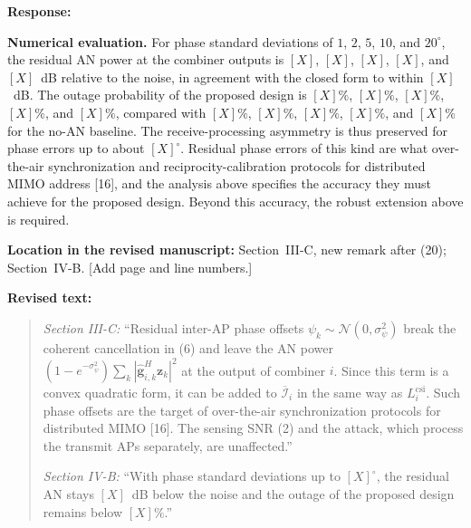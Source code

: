 \documentclass[a4paper,12pt]{article}
\newenvironment{response}{\par\textbf{Response:}\par}{\par}
\newcommand{\revisionlocation}[1]{\par\textbf{Location in the revised manuscript:} #1\par}
\newenvironment{revisedtext}{%
  \par\textbf{Revised text:}\begin{quote}\color{red}
}{\end{quote}}
\begin{document}
\begin{response}
\textbf{Numerical evaluation.} For phase standard deviations of $1$, $2$,
$5$, $10$, and $20^\circ$, the residual AN power at the combiner outputs is
$[X]$, $[X]$, $[X]$, $[X]$, and $[X]$~dB relative to the noise, in agreement
with the closed form to within $[X]$~dB. The outage probability of the
proposed design is $[X]\%$, $[X]\%$, $[X]\%$, $[X]\%$, and $[X]\%$, compared
with $[X]\%$, $[X]\%$, $[X]\%$, $[X]\%$, and $[X]\%$ for the no-AN baseline.
The receive-processing asymmetry is thus preserved for phase errors up to
about $[X]^\circ$. Residual phase errors of this kind are what over-the-air
synchronization and reciprocity-calibration protocols for distributed MIMO
address [16], and the analysis above specifies the accuracy they must
achieve for the proposed design. Beyond this accuracy, the robust extension
above is required.
\end{response}
\revisionlocation{Section~III-C, new remark after (20); Section~IV-B. [Add
page and line numbers.]}
\begin{revisedtext}
\textit{Section III-C:} ``Residual inter-AP phase offsets
$\psi_k\sim\mathcal{N}(0,\sigma_\psi^2)$ break the coherent cancellation in
(6) and leave the AN power
$(1-e^{-\sigma_\psi^2})\sum_k|\widehat{\mathbf{g}}_{i,k}^H\mathbf{z}_k|^2$ at
the output of combiner $i$. Since this term is a convex quadratic form, it
can be added to $\overline{\mathcal{I}}_i$ in the same way as
$L_i^{\mathrm{csi}}$. Such phase offsets are the target of over-the-air
synchronization protocols for distributed MIMO [16]. The sensing SNR (2)
and the attack, which process the transmit APs separately, are
unaffected.''

\textit{Section IV-B:} ``With phase standard deviations up to $[X]^\circ$,
the residual AN stays $[X]$~dB below the noise and the outage of the
proposed design remains below $[X]\%$.''
\end{revisedtext}
\end{document}
